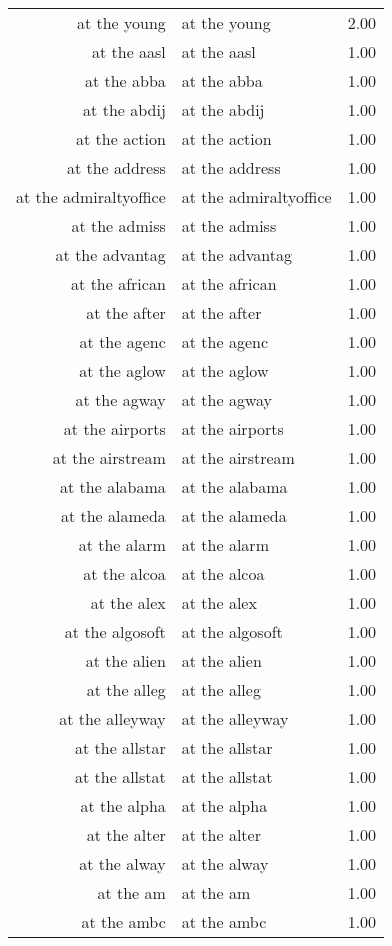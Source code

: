 \begin{table}[ht]
\begin{tabular}{rlr}
  at the young & at the young & 2.00 \\ 
  at the aasl & at the aasl & 1.00 \\ 
  at the abba & at the abba & 1.00 \\ 
  at the abdij & at the abdij & 1.00 \\ 
  at the action & at the action & 1.00 \\ 
  at the address & at the address & 1.00 \\ 
  at the admiraltyoffice & at the admiraltyoffice & 1.00 \\ 
  at the admiss & at the admiss & 1.00 \\ 
  at the advantag & at the advantag & 1.00 \\ 
  at the african & at the african & 1.00 \\ 
  at the after & at the after & 1.00 \\ 
  at the agenc & at the agenc & 1.00 \\ 
  at the aglow & at the aglow & 1.00 \\ 
  at the agway & at the agway & 1.00 \\ 
  at the airports & at the airports & 1.00 \\ 
  at the airstream & at the airstream & 1.00 \\ 
  at the alabama & at the alabama & 1.00 \\ 
  at the alameda & at the alameda & 1.00 \\ 
  at the alarm & at the alarm & 1.00 \\ 
  at the alcoa & at the alcoa & 1.00 \\ 
  at the alex & at the alex & 1.00 \\ 
  at the algosoft & at the algosoft & 1.00 \\ 
  at the alien & at the alien & 1.00 \\ 
  at the alleg & at the alleg & 1.00 \\ 
  at the alleyway & at the alleyway & 1.00 \\ 
  at the allstar & at the allstar & 1.00 \\ 
  at the allstat & at the allstat & 1.00 \\ 
  at the alpha & at the alpha & 1.00 \\ 
  at the alter & at the alter & 1.00 \\ 
  at the alway & at the alway & 1.00 \\ 
  at the am & at the am & 1.00 \\ 
  at the ambc & at the ambc & 1.00 \\ 

\end{tabular}
\end{table}
